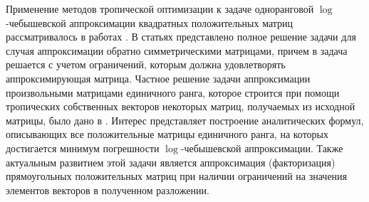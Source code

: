 \documentclass[specialist,
               substylefile = spbu.rtx,
               subf,href,colorlinks=true, 12pt]{disser}
\theoremstyle{definition}
\begin{document}
Применение методов тропической оптимизации к задаче одноранговой $\log$-че\-бы\-шевской аппроксимации квадратных положительных матриц рассматривалось в работах \cite{Krivulin2015Rating,Krivulin2016Using,Krivulin2009Methods}. В статьях \cite{Krivulin2015Rating,Krivulin2016Using} представлено полное решение задачи  для случая аппроксимации обратно симметрическими матрицами, причем в \cite{Krivulin2015Rating} задача решается  с учетом ограничений, которым должна удовлетворять аппроксимирующая матрица. Частное решение задачи аппроксимации произвольными матрицами единичного ранга, которое строится при помощи тропических собственных векторов некоторых матриц, получаемых из исходной матри­цы, было дано в \cite{Krivulin2009Methods}.
Интерес представляет построение аналитических формул, описывающих все положительные матрицы единичного ранга, на которых достигается минимум погрешности $\log$-че\-бы\-шевской аппроксимации. Также актуальным развитием этой задачи является аппроксимация (факторизация) прямоугольных положительных матриц при наличии ограничений на значения элементов векторов в полученном разложении.%

\end{document}
